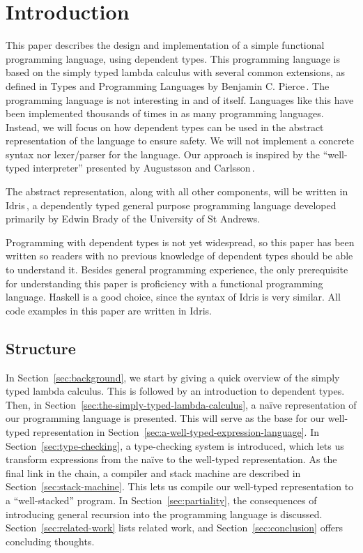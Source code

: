 \section{Introduction}
\label{sec:introduction}

This paper describes the design and implementation of a simple functional programming language, using dependent types. This programming language is based on the simply typed lambda calculus with several common extensions, as defined in Types and Programming Languages by Benjamin C. Pierce\,\cite{Pierce:TypeSystems}. The programming language is not interesting in and of itself. Languages like this have been implemented thousands of times in as many programming languages. Instead, we will focus on how dependent types can be used in the abstract representation of the language to ensure safety. We will not implement a concrete syntax nor lexer/parser for the language. Our approach is inspired by the ``well-typed interpreter'' presented by Augustsson and Carlsson\,\cite{Augustsson99anexercise}. 

The abstract representation, along with all other components, will be written in Idris\,\cite{Idris}, a dependently typed general purpose programming language developed primarily by Edwin Brady of the University of St Andrews.  

Programming with dependent types is not yet widespread, so this paper has been written so readers with no previous knowledge of dependent types should be able to understand it. Besides general programming experience, the only prerequisite for understanding this paper is proficiency with a functional programming language. Haskell is a good choice, since the syntax of Idris is very similar. All code examples in this paper are written in Idris.

\subsection{Structure}
In Section~\ref{sec:background}, we start by giving a quick overview of the simply typed lambda calculus. This is followed by an introduction to dependent types. Then, in Section~\ref{sec:the-simply-typed-lambda-calculus}, a naïve representation of our programming language is presented. This will serve as the base for our well-typed representation in Section~\ref{sec:a-well-typed-expression-language}. In Section~\ref{sec:type-checking}, a type-checking system is introduced, which lets us transform expressions from the naïve to the well-typed representation. As the final link in the chain, a compiler and stack machine are described in Section~\ref{sec:stack-machine}. This lets us compile our well-typed representation to a ``well-stacked'' program. In Section~\ref{sec:partiality}, the consequences of introducing general recursion into the programming language is discussed. Section~\ref{sec:related-work} lists related work, and Section~\ref{sec:conclusion} offers concluding thoughts.
